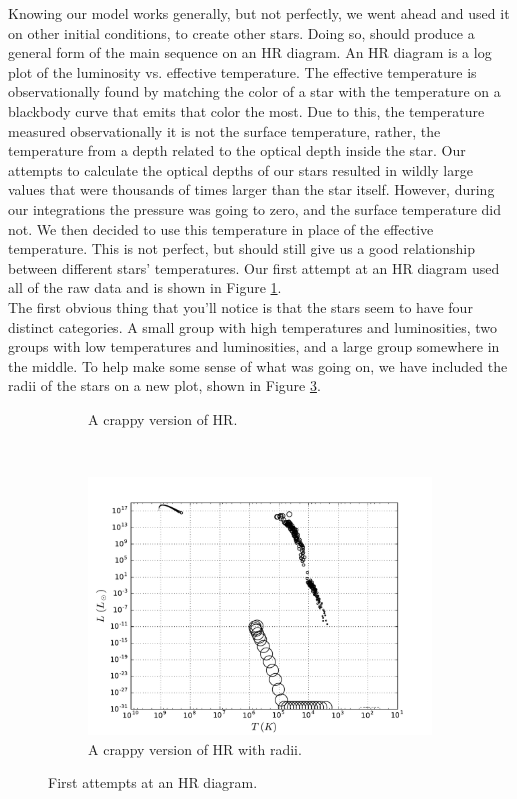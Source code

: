 \documentclass[10pt]{article}
\begin{document}
Knowing our model works generally, but not perfectly, we went ahead and used it on other initial conditions, to create other stars. Doing so, should produce a general form of the main sequence on an HR diagram. An HR diagram is a log plot of the luminosity vs. effective temperature. The effective temperature is observationally found by matching the color of a star with the temperature on a blackbody curve that emits that color the most. Due to this, the temperature measured observationally it is not the surface temperature, rather, the temperature from a depth related to the optical depth inside the star. Our attempts to calculate the optical depths of our stars resulted in wildly large values that were thousands of times larger than the star itself. However, during our integrations the pressure was going to zero, and the surface temperature did not. We then decided to use this temperature in place of the effective temperature. This is not perfect, but should still give us a good relationship between different stars' temperatures. Our first attempt at an HR diagram used all of the raw data and is shown in Figure \ref{fig:badHR}. \\

The first obvious thing that you'll notice is that the stars seem to have four distinct categories. A small group with high temperatures and luminosities, two groups with low temperatures and luminosities, and a large group somewhere in the middle. To help make some sense of what was going on, we have included the radii of the stars on a new plot, shown in Figure \ref{fig:nosobadHR}. \\

\begin{figure}[p]
\centering
\begin{subfigure}{\textwidth}
\centering

\caption{A crappy version of HR.}
\label{fig:badHR}
\end{subfigure} \\
\begin{subfigure}{\textwidth}
\centering
\includegraphics[height=0.4\textheight]{new_bad_hr.pdf}
\caption{A crappy version of HR with radii.}
\label{fig:nosobadHR}
\end{subfigure}
\caption{First attempts at an HR diagram.}
\end{figure}
\end{document}
